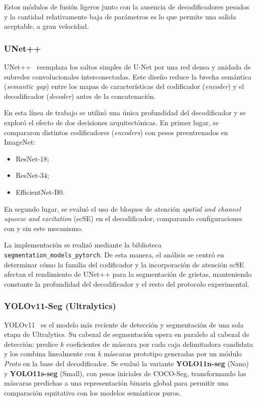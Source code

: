 \documentclass[conference]{IEEEtran}
\begin{document}
Estos módulos de fusión ligeros junto con la ausencia de decodificadores pesados y la cantidad relativamente baja de parámetros es lo que permite una salida aceptable, a gran velocidad.

\subsubsection{UNet++}

UNet++~\cite{zhou2018unetplusplus} reemplaza los saltos simples de U-Net por una red densa y anidada de subredes convolucionales interconectadas. Este diseño reduce la brecha semántica (\textit{semantic gap}) entre los mapas de características del codificador (\textit{encoder}) y el decodificador (\textit{decoder}) antes de la concatenación.

En esta línea de trabajo se utilizó una única profundidad del decodificador y se exploró el efecto de dos decisiones arquitectónicas. En primer lugar, se compararon distintos codificadores (\textit{encoders}) con pesos preentrenados en ImageNet:

\begin{itemize}
    \item ResNet-18;
    \item ResNet-34;
    \item EfficientNet-B0.
\end{itemize}

En segundo lugar, se evaluó el uso de bloques de atención \textit{spatial and channel squeeze and excitation} (scSE) en el decodificador, comparando configuraciones con y sin este mecanismo.

La implementación se realizó mediante la biblioteca \texttt{segmentation\_models\_pytorch}. De esta manera, el análisis se centró en determinar cómo la familia del codificador y la incorporación de atención scSE afectan el rendimiento de UNet++ para la segmentación de grietas, manteniendo constante la profundidad del decodificador y el resto del protocolo experimental.

\subsubsection{YOLOv11-Seg (Ultralytics)}
YOLOv11~\cite{kahn2024yolo11} es el modelo más reciente de detección y segmentación de una sola etapa de Ultralytics. Su cabezal de segmentación opera en paralelo al cabezal de detección: predice $k$ coeficientes de máscara por cada caja delimitadora candidata y los combina linealmente con $k$ máscaras prototipo generadas por un módulo \textit{Proto} en la base del decodificador. Se evaluó la variante \textbf{YOLO11n-seg} (Nano) y \textbf{YOLO11s-seg} (Small), con pesos iniciales de COCO-Seg, transformando las máscaras predichas a una representación binaria global para permitir una comparación equitativa con los modelos semánticos puros.
\end{document}
